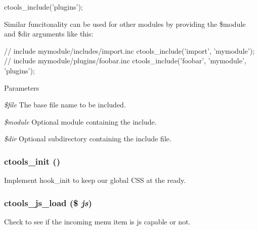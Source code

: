 \begin{DoxyCode}
 ctools_include('plugins');
\end{DoxyCode}


Similar funcitonality can be used for other modules by providing the \$module and \$dir arguments like this:


\begin{DoxyCode}
 // include mymodule/includes/import.inc
 ctools_include('import', 'mymodule');
 // include mymodule/plugins/foobar.inc
 ctools_include('foobar', 'mymodule', 'plugins');
\end{DoxyCode}



\begin{DoxyParams}{Parameters}
\item[{\em \$file}]The base file name to be included. \item[{\em \$module}]Optional module containing the include. \item[{\em \$dir}]Optional subdirectory containing the include file. \end{DoxyParams}
\hypertarget{ctools_8module_a27c07c71e495f2aacb20b8291dffc65a}{
\subsubsection[{ctools\_\-init}]{\setlength{\rightskip}{0pt plus 5cm}ctools\_\-init ()}}
\label{ctools_8module_a27c07c71e495f2aacb20b8291dffc65a}
Implement hook\_\-init to keep our global CSS at the ready. \hypertarget{ctools_8module_a5d07b6c831cc85a1bde277a817d3675d}{
\subsubsection[{ctools\_\-js\_\-load}]{\setlength{\rightskip}{0pt plus 5cm}ctools\_\-js\_\-load (\$ {\em js})}}
\label{ctools_8module_a5d07b6c831cc85a1bde277a817d3675d}
Check to see if the incoming menu item is js capable or not.

